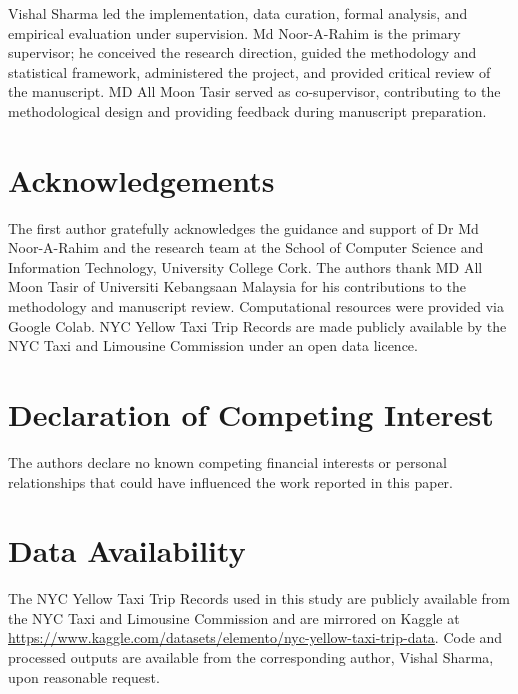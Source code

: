 \documentclass[a4paper,fleqn]{cas-dc}
\begin{document}
Vishal Sharma led the implementation, data curation, formal analysis, and empirical evaluation under supervision.  Md Noor-A-Rahim is the primary supervisor; he conceived the research direction, guided the methodology and statistical framework, administered the project, and provided critical review of the manuscript.  MD All Moon Tasir served as co-supervisor, contributing to the methodological design and providing feedback during manuscript preparation.

\section*{Acknowledgements}
The first author gratefully acknowledges the guidance and support of Dr Md Noor-A-Rahim and the research team at the School of Computer Science and Information Technology, University College Cork.  The authors thank MD All Moon Tasir of Universiti Kebangsaan Malaysia for his contributions to the methodology and manuscript review.  Computational resources were provided via Google Colab.  NYC Yellow Taxi Trip Records are made publicly available by the NYC Taxi and Limousine Commission under an open data licence.

\section*{Declaration of Competing Interest}
The authors declare no known competing financial interests or personal relationships that could have influenced the work reported in this paper.

\section*{Data Availability}
The NYC Yellow Taxi Trip Records used in this study are publicly available from the NYC Taxi and Limousine Commission and are mirrored on Kaggle at \url{https://www.kaggle.com/datasets/elemento/nyc-yellow-taxi-trip-data}.  Code and processed outputs are available from the corresponding author, Vishal Sharma, upon reasonable request.



\end{document}
